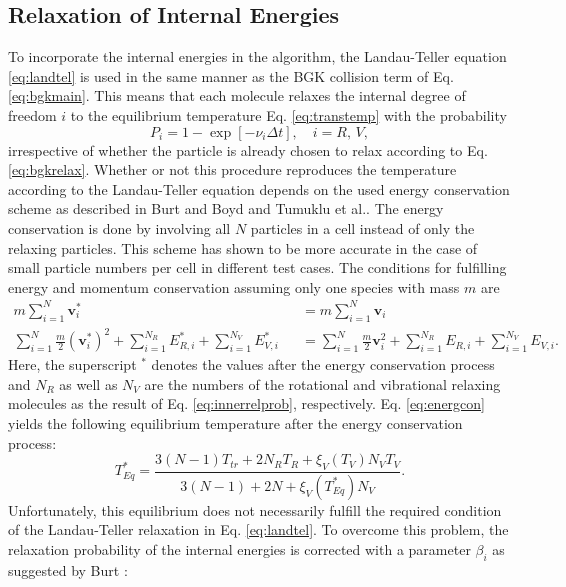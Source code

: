 \documentclass[aip,pof,amsmath,amssymb,preprint]{revtex4-1}
\begin{document}
\subsection{Relaxation of Internal Energies}
To incorporate the internal energies in the algorithm, the Landau-Teller equation \eqref{eq:landtel} is used in the same manner as the
BGK collision term of Eq. \eqref{eq:bgkmain}. This means that each molecule relaxes the internal degree of freedom $i$ to the equilibrium temperature Eq.
\eqref{eq:transtemp} with the probability
\begin{equation}
P_i=1-\exp\left[-\nu_i \Delta t\right],\quad i=R,\,V,
\label{eq:innerrelprob}
\end{equation}
irrespective of whether the particle is already chosen to relax according to Eq. \eqref{eq:bgkrelax}.
Whether or not this procedure reproduces the temperature according to the Landau-Teller equation depends on the used energy conservation scheme
as described in Burt and Boyd\cite{burt2006evaluation} and Tumuklu et al.\cite{tumuklu2016particle}.
The energy conservation is done by involving all $N$ particles in a cell instead of only the relaxing particles. 
This scheme has shown to be more accurate in the case of small particle numbers per cell in different test cases\cite{Pfeiffer2018}. 
The conditions for fulfilling energy and momentum conservation assuming only one species with mass $m$ are
\begin{eqnarray}
m\sum_{i=1}^N \mathbf v^*_i &&= m\sum_{i=1}^N \mathbf v_i \\
\sum_{i=1}^N \frac{m}{2}\left(\mathbf v^*_i\right)^2 +\sum_{i=1}^{N_R} E^*_{R,i} + \sum_{i=1}^{N_V} E^*_{V,i} &&= \sum_{i=1}^N \frac{m}{2}\mathbf v_i^2 +\sum_{i=1}^{N_R} E_{R,i} + \sum_{i=1}^{N_V} E_{V,i}.\label{eq:energcon}
\end{eqnarray}
Here, the superscript $^*$ denotes the values after the energy conservation process and $N_R$ as well as $N_V$ are the numbers of the rotational and vibrational relaxing molecules 
as the result of Eq. \eqref{eq:innerrelprob}, respectively. 
Eq. \eqref{eq:energcon} yields the following equilibrium temperature after the energy conservation process:
\begin{equation}
T^*_{Eq}=\frac{3(N-1)T_{tr}+2N_RT_R+\xi_V(T_V)N_VT_V}{3(N-1)+2N+\xi_V(T^*_{Eq})N_V}.
\end{equation}
Unfortunately, this equilibrium does not necessarily fulfill the required condition of the Landau-Teller relaxation in Eq. \eqref{eq:landtel}.
To overcome this problem, the relaxation probability of the internal energies is corrected with a parameter $\beta_i$ as suggested by Burt \cite{burt2006evaluation}:
\end{document}

